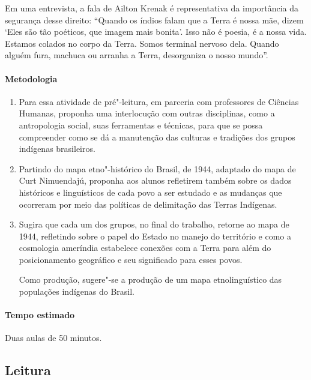 \documentclass[12pt]{extarticle}
\begin{document}
Em uma entrevista, a fala de Ailton Krenak é representativa da importância da segurança desse direito:
``Quando os índios falam que a Terra é nossa mãe, dizem ‘Eles são tão poéticos, que imagem mais bonita’. 
Isso não é poesia, é a nossa vida. 
Estamos colados no corpo da Terra. 
Somos terminal nervoso dela. 
Quando alguém fura, machuca ou arranha a Terra, desorganiza o nosso mundo''. 

\paragraph{Metodologia}

\begin{enumerate}
\item Para essa atividade de pré"-leitura, em parceria com professores de Ciências Humanas, 
proponha uma interlocução com outras disciplinas, como a antropologia social, suas ferramentas 
e técnicas, para que se possa compreender como se dá a manutenção das culturas e tradições dos 
grupos indígenas brasileiros. 

\item Partindo do mapa etno"-histórico do Brasil, de 1944, adaptado do mapa de Curt Nimuendajú,
proponha aos alunos refletirem também sobre os dados históricos e linguísticos de cada povo
a ser estudado e as mudanças que ocorreram por meio das políticas de delimitação das Terras 
Indígenas. 

\item Sugira que cada um dos grupos, no final do trabalho, retorne ao mapa de 1944, refletindo 
sobre o papel do Estado no manejo do território e como a cosmologia ameríndia estabelece 
conexões com a Terra para além do posicionamento geográfico e seu significado para esses povos.

Como produção, sugere"-se a produção de um mapa etnolinguístico das populações indígenas do Brasil.
\end{enumerate}


\paragraph{Tempo estimado} Duas aulas de 50 minutos.


\subsection{Leitura}
\end{document}
